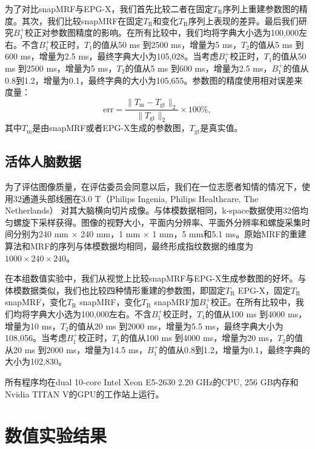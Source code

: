 为了对比snapMRF与EPG-X，我们首先比较二者在固定$T_\mathrm{R}$序列上重建参数图的精度。其次，我们比较snapMRF在固定$T_\mathrm{R}$和变化$T_\mathrm{R}$序列上表现的差异。最后我们研究$B_1^+$校正对参数图精度的影响。在所有比较中，我们均将字典大小选为100,000左右。不含$B_1^+$校正时，$T_1$的值从50 ms 到2500 ms，增量为5 ms，$T_2$的值从5 ms 到600 ms，增量为2.5 ms，最终字典大小为105,028。当考虑$B_1^+$校正时，$T_1$的值从50 ms 到2500 ms，增量为5 ms，$T_2$的值从5 ms 到600 ms，增量为2.5 ms，$B_1^+$的值从0.8到1.2，增量为0.1，最终字典的大小为105,655。参数图的精度使用相对误差来度量：
\begin{equation}
	\mathrm{err} = \frac{\|T_\mathrm{m}-T_\mathrm{gt}\|_2}{\|T_\mathrm{gt}\|_2}\times 100\%,
\end{equation}
其中$T_\mathrm{m}$是由snapMRF或者EPG-X生成的参数图，$T_\mathrm{gt}$是真实值。

\subsection{活体人脑数据}
为了评估图像质量，在评估委员会同意以后，我们在一位志愿者知情的情况下，使用32通道头部线圈在3.0 T（Philips Ingenia, Philips Healthcare, The Netherlands） 对其大脑横向切片成像。与体模数据相同，k-space数据使用32倍均匀螺旋下采样获得\cite{pipe_spiral_2014}。图像的视野大小，平面内分辨率、平面外分辨率和螺旋采集时间分别为240 mm $\times$ 240 mm，1 mm $\times$ 1 mm，5 mm和5.1 ms。原始MRF的重建算法和MRF的序列与体模数据均相同，最终形成指纹数据的维度为$1000 \times 240 \times 240$。

在本组数值实验中，我们从视觉上比较snapMRF与EPG-X生成参数图的好坏。与体模数据类似，我们也比较四种情形重建的参数图，即固定$T_\mathrm{R}$ EPG-X，固定$T_\mathrm{R}$ snapMRF，变化$T_\mathrm{R}$ snapMRF，变化$T_\mathrm{R}$ snapMRF加$B_1^+$校正。在所有比较中，我们均将字典大小选为100,000左右。不含$B_1^+$校正时，$T_1$的值从100 ms 到4000 ms，增量为10 ms，$T_2$的值从20 ms 到2000 ms，增量为5.5 ms，最终字典大小为108,056。当考虑$B_1^+$校正时，$T_1$的值从100 ms 到4000 ms，增量为20 ms，$T_2$的值从20 ms 到2000 ms，增量为14.5 ms，$B_1^+$的值从0.8到1.2，增量为0.1，最终字典的大小为102,830。

所有程序均在dual 10-core Intel Xeon E5-2630 2.20 GHz的CPU, 256 GB内存和Nvidia TITAN V的GPU的工作站上运行。

\section{数值实验结果}
